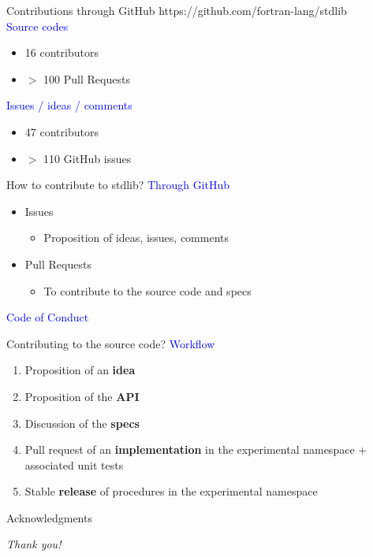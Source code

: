 \documentclass{beamer}
\begin{document}
\begin{frame}[c]{Contributions through GitHub}
	https://github.com/fortran-lang/stdlib\\
	\textcolor{blue}{Source codes}
	\begin{itemize}
		\item 16 contributors
		\item $>$ 100 Pull Requests
	\end{itemize}
	\textcolor{blue}{Issues / ideas / comments}
	\begin{itemize}
		\item 47 contributors
		\item $>$ 110 GitHub issues
	\end{itemize}	
\end{frame}


\begin{frame}[c]{How to contribute to stdlib?}
	\textcolor{blue}{Through GitHub}\\
	\begin{itemize}
		\item Issues
		\begin{itemize}
			\item Proposition of ideas, issues, comments
		\end{itemize}
		\item Pull Requests
		\begin{itemize}
			\item To contribute to the source code and specs
		\end{itemize}
	\end{itemize}
	\textcolor{blue}{Code of Conduct}\\
\end{frame}

\begin{frame}[c]{Contributing to the source code?}
	\textcolor{blue}{Workflow}
	\begin{enumerate}
		\item Proposition of an \textbf{idea}
		\item Proposition of the \textbf{API}
		\item Discussion of the \textbf{specs}
		\item Pull request of an \textbf{implementation} in the experimental namespace + associated unit tests
		\item Stable \textbf{release} of procedures in the experimental namespace
	\end{enumerate}
\end{frame}


\begin{frame}[c]{Acknowledgments}
	
\end{frame}

\begin{frame}[c]{}
	\centering \Huge
	\emph{Thank you!}
\end{frame}
\end{document}
